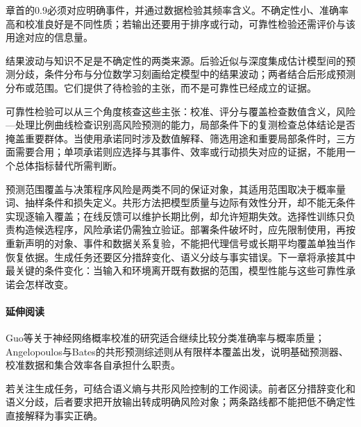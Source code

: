 章首的0.9必须对应明确事件，并通过数据检验其频率含义。不确定性小、准确率高和校准良好是不同性质；若输出还要用于排序或行动，可靠性检验还需评价与该用途对应的信息量。

结果波动与知识不足是不确定性的两类来源。后验近似与深度集成估计模型间的预测分歧，条件分布与分位数学习刻画给定模型中的结果波动；两者结合后形成预测分布或范围。它们提供了待检验的主张，而不是可靠性已经成立的证据。

可靠性检验可以从三个角度核查这些主张：校准、评分与覆盖检查数值含义，风险—处理比例曲线检查识别高风险预测的能力，局部条件下的复测检查总体结论是否掩盖重要群体。当使用承诺同时涉及数值解释、筛选用途和重要局部条件时，三方面需要合用；单项承诺则应选择与其事件、效率或行动损失对应的证据，不能用一个总体指标替代所需判断。

预测范围覆盖与决策程序风险是两类不同的保证对象，其适用范围取决于概率量词、抽样条件和损失定义。共形方法把模型质量与边际有效性分开，却不能无条件实现逐输入覆盖；在线反馈可以维护长期比例，却允许短期失效。选择性训练只负责构造候选程序，风险承诺仍需独立验证。部署条件破坏时，应先限制使用，再按重新声明的对象、事件和数据关系复验，不能把代理信号或长期平均覆盖单独当作恢复依据。生成任务还要区分措辞变化、语义分歧与事实错误。下一章将承接其中最关键的条件变化：当输入和环境离开既有数据的范围，模型性能与这些可靠性承诺会怎样改变。

\paragraph{延伸阅读}

Guo等关于神经网络概率校准的研究适合继续比较分类准确率与概率质量；Angelopoulos与Bates的共形预测综述则从有限样本覆盖出发，说明基础预测器、校准数据和集合效率各自承担什么职责。

若关注生成任务，可结合语义熵与共形风险控制的工作阅读。前者区分措辞变化和语义分歧，后者要求把开放输出转成明确风险对象；两条路线都不能把低不确定性直接解释为事实正确。
